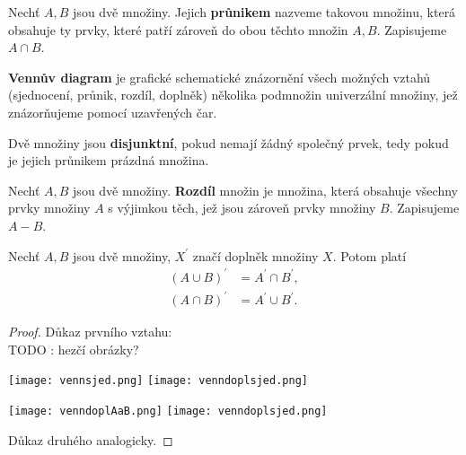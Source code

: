 \begin{definition}
  Nechť $A, B$ jsou dvě množiny. Jejich \textbf{průnikem} nazveme takovou množinu, která obsahuje ty prvky, které patří zároveň do obou těchto množin $A, B$. Zapisujeme $A \cap B$.
\end{definition}

\begin{definition}
  \textbf{Vennův diagram} je grafické schematické znázornění všech možných vztahů (sjednocení, průnik, rozdíl, doplněk) několika podmnožin univerzální množiny, jež znázorňujeme pomocí uzavřených čar.
\end{definition}

\begin{definition}
  Dvě množiny jsou \textbf{disjunktní}, pokud nemají žádný společný prvek, tedy pokud je jejich průnikem prázdná množina.
\end{definition}

\begin{definition}
  Nechť $A, B$ jsou dvě množiny. \textbf{Rozdíl} množin je množina, která obsahuje všechny prvky množiny $A$ s výjimkou těch, jež jsou zároveň prvky množiny $B$. Zapisujeme $A - B$.
\end{definition}

\begin{veta}
  Nechť $A, B$ jsou dvě množiny, $X^\prime$ značí doplněk množiny $X$. Potom platí
  \begin{align*}
  (A \cup B)^\prime &= A^\prime \cap B^\prime, \\
  (A \cap B)^\prime &= A^\prime \cup B^\prime.
  \end{align*}
\end{veta}

\begin{proof}
  Důkaz prvního vztahu:
  \\ TODO : hezčí obrázky?\\
  \begin{minipage}{0.5\textwidth}
    \centering
        \texttt{[image: vennsjed.png]}
        \texttt{[image: venndoplsjed.png]}
  \end{minipage}
  \hfill
  \noindent\begin{minipage}{0.5\textwidth}
  \centering
        \texttt{[image: venndoplAaB.png]}
        \texttt{[image: venndoplsjed.png]}
  \end{minipage}

  Důkaz druhého analogicky.
\end{proof}

